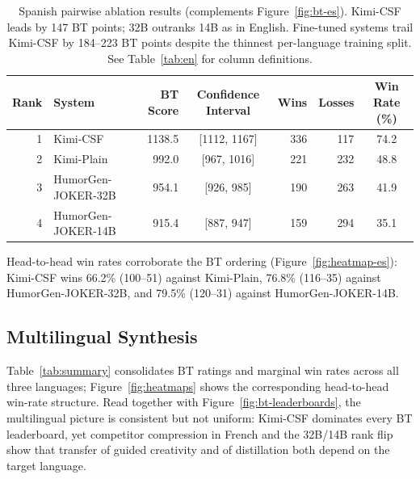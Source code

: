 \documentclass[]{ceurart}
\begin{document}
\begin{table}[h]
  \caption{Spanish pairwise ablation results (complements Figure~\ref{fig:bt-es}).
    Kimi-CSF leads by 147 BT points; 32B outranks 14B as in English.
    Fine-tuned systems trail Kimi-CSF by 184--223 BT points despite the
    thinnest per-language training split. See Table~\ref{tab:en} for column definitions.}
  \label{tab:es}
  \small
  \begin{tabular}{rlrcrrc}
    \toprule
    Rank & System & BT Score & Confidence Interval & Wins & Losses & Win Rate (\%) \\
    \midrule
    1 & Kimi-CSF            & 1138.5 & [1112, 1167] & 336 & 117 & 74.2 \\
    2 & Kimi-Plain          &  992.0 & [967, 1016] & 221 & 232 & 48.8 \\
    3 & HumorGen-JOKER-32B  &  954.1 & [926, 985] & 190 & 263 & 41.9 \\
    4 & HumorGen-JOKER-14B  &  915.4 & [887, 947] & 159 & 294 & 35.1 \\
    \bottomrule
  \end{tabular}
\end{table}

Head-to-head win rates corroborate the BT ordering
(Figure~\ref{fig:heatmap-es}): Kimi-CSF wins 66.2\% (100--51) against
Kimi-Plain, 76.8\% (116--35) against HumorGen-JOKER-32B, and 79.5\%
(120--31) against HumorGen-JOKER-14B.



\subsection{Multilingual Synthesis}
\label{sec:summary}

Table~\ref{tab:summary} consolidates BT ratings and marginal win rates across
all three languages; Figure~\ref{fig:heatmaps} shows the corresponding
head-to-head win-rate structure.
Read together with Figure~\ref{fig:bt-leaderboards}, the multilingual picture
is consistent but not uniform: Kimi-CSF dominates every BT leaderboard, yet
competitor compression in French and the 32B/14B rank flip show that
transfer of guided creativity and of distillation both depend on the target
language.
\end{document}
